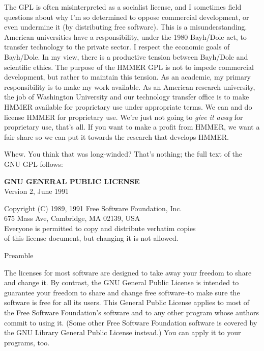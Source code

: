 The GPL is often misinterpreted as a socialist license, and I
sometimes field questions about why I'm so determined to oppose
commercial development, or even undermine it (by distributing free
software). This is a misunderstanding. American universities have a
responsibility, under the 1980 Bayh/Dole act, to transfer technology
to the private sector. I respect the economic goals of Bayh/Dole. In
my view, there is a productive tension between Bayh/Dole and
scientific ethics. The purpose of the HMMER GPL is not to impede
commercial development, but rather to maintain this tension.  As an
academic, my primary responsibility is to make my work available. As
an American research university, the job of Washington University and
our technology transfer office is to make HMMER available for
proprietary use under appropriate terms. We can and do license HMMER
for proprietary use. We're just not going to {\em give it away} for
proprietary use, that's all. If you want to make a profit from HMMER,
we want a fair share so we can put it towards the research that
develops HMMER.

Whew. You think that was long-winded? That's nothing; the full text of
the GNU GPL follows:

\begin{center}
{\bf GNU GENERAL PUBLIC LICENSE} \\
Version 2, June 1991
\end{center}

\begin{center}
Copyright (C) 1989, 1991 Free Software Foundation, Inc.\\
675 Mass Ave, Cambridge, MA 02139, USA\\
Everyone is permitted to copy and distribute verbatim copies\\
of this license document, but changing it is not allowed.\\
\end{center}

\begin{center}
Preamble
\end{center}

The licenses for most software are designed to take away your
freedom to share and change it.  By contrast, the GNU General Public
License is intended to guarantee your freedom to share and change free
software--to make sure the software is free for all its users.  This
General Public License applies to most of the Free Software
Foundation's software and to any other program whose authors commit to
using it.  (Some other Free Software Foundation software is covered by
the GNU Library General Public License instead.)  You can apply it to
your programs, too.

